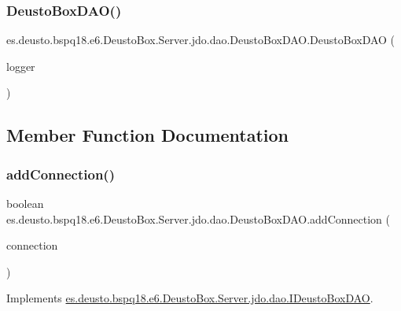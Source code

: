 \subsubsection{\texorpdfstring{Deusto\+Box\+D\+A\+O()}{DeustoBoxDAO()}}
{\footnotesize\ttfamily es.\+deusto.\+bspq18.\+e6.\+Deusto\+Box.\+Server.\+jdo.\+dao.\+Deusto\+Box\+D\+A\+O.\+Deusto\+Box\+D\+AO (\begin{DoxyParamCaption}\item[{\mbox{\hyperlink{classes_1_1deusto_1_1bspq18_1_1e6_1_1_deusto_box_1_1_server_1_1utils_1_1_error__log}{Error\+\_\+log}}}]{logger }\end{DoxyParamCaption})}



\subsection{Member Function Documentation}
\mbox{\label{classes_1_1deusto_1_1bspq18_1_1e6_1_1_deusto_box_1_1_server_1_1jdo_1_1dao_1_1_deusto_box_d_a_o_a08be11b50fb6622c2b3a961f24c1d940}} 
\subsubsection{\texorpdfstring{add\+Connection()}{addConnection()}}
{\footnotesize\ttfamily boolean es.\+deusto.\+bspq18.\+e6.\+Deusto\+Box.\+Server.\+jdo.\+dao.\+Deusto\+Box\+D\+A\+O.\+add\+Connection (\begin{DoxyParamCaption}\item[{\mbox{\hyperlink{classes_1_1deusto_1_1bspq18_1_1e6_1_1_deusto_box_1_1_server_1_1jdo_1_1data_1_1_d_connection}{D\+Connection}}}]{connection }\end{DoxyParamCaption})}



Implements \mbox{\hyperlink{interfacees_1_1deusto_1_1bspq18_1_1e6_1_1_deusto_box_1_1_server_1_1jdo_1_1dao_1_1_i_deusto_box_d_a_o_aee8406e88334179d4692d118e6ba221d}{es.\+deusto.\+bspq18.\+e6.\+Deusto\+Box.\+Server.\+jdo.\+dao.\+I\+Deusto\+Box\+D\+AO}}.

